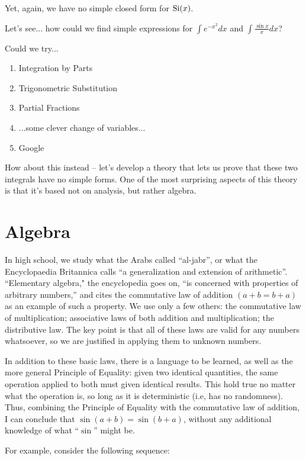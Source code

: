 Yet, again, we have no simple closed form for ${\rm Si}(x)$.

Let's see... how could we find simple expressions for $\int e^{-x^2} dx$ and $\int \frac{\sin x}{x} dx$?

Could we try...

\begin{enumerate}
\item Integration by Parts
\item Trigonometric Substitution
\item Partial Fractions
\item ...some clever change of variables...
\item Google
\end{enumerate}

How about this instead -- let's develop a theory that lets us
prove that these two integrals have no simple forms.  One
of the most surprising aspects of this theory is that
it's based not on analysis, but rather algebra.


\vfill\eject
\section{Algebra}

In high school, we study what the Arabs called ``al-jabr'', or what
the Encyclopaedia Britannica calls ``a generalization and extension of
arithmetic''.  ``Elementary algebra," the encyclopedia goes on, ``is
concerned with properties of arbitrary numbers,'' and cites the
commutative law of addition $(a+b=b+a)$ as an example of such a
property.  We use only a few others: the commutative law of
multiplication; associative laws of both addition and multiplication;
the distributive law.  The key point is that all of these laws are
valid for any numbers whatsoever, so we are justified in applying them
to unknown numbers.

In addition to these basic laws, there is a language to be learned, as
well as the more general Principle of Equality: given two identical
quantities, the same operation applied to both must given identical
results.  This hold true no matter what the operation is, so long as
it is deterministic (i.e, has no randomness).  Thus, combining the
Principle of Equality with the commutative law of addition, I can
conclude that $\sin(a+b)=\sin(b+a)$, without any additional knowledge of
what ``$\sin$'' might be.

For example, consider the following sequence:

